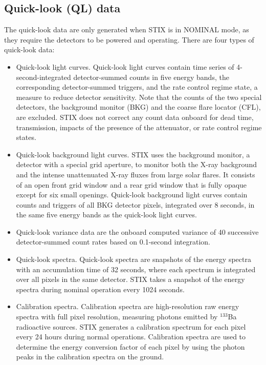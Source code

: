 \documentclass[referee]{aa} %
\begin{document}
\subsection{Quick-look (QL) data}
The quick-look data are only generated when STIX is in NOMINAL mode, as they require the detectors to be powered and operating. There are four types of quick-look data:
\begin{itemize}
\item Quick-look light curves. Quick-look light curves contain time series of 4-second-integrated detector-summed counts in five energy bands, the corresponding detector-summed triggers, and the rate control regime state, a measure to reduce detector sensitivity. Note that the counts of the two special detectors, the background monitor (BKG) and the coarse flare locator (CFL), are excluded. STIX does not correct any count data onboard for dead time, transmission, impacts of the presence of the attenuator, or rate control regime states.

\item Quick-look background light curves. STIX uses the background monitor, a detector with a special grid aperture, to monitor both the X-ray background and the intense unattenuated X-ray fluxes from large solar flares. It consists of an open front grid window and a rear grid window that is fully opaque except for six small openings. Quick-look background light curves contain counts and triggers of all BKG detector pixels, integrated over 8 seconds, in the same five energy bands as the quick-look light curves. 

\item Quick-look variance data are the onboard computed variance of 40 successive detector-summed count rates based on 0.1-second integration.

\item Quick-look spectra. Quick-look spectra are snapshots of the energy spectra with an accumulation time of 32 seconds, where each spectrum is integrated over all pixels in the same detector. STIX takes a snapshot of the energy spectra during nominal operation every 1024 seconds.

\item Calibration spectra. Calibration spectra are high-resolution raw energy spectra with full pixel resolution, measuring photons emitted by $^{133}$Ba radioactive sources. STIX generates a calibration spectrum for each pixel every 24 hours during normal operations. Calibration spectra are used to determine the energy conversion factor of each pixel by using the photon peaks in the calibration spectra on the ground.  
\end{itemize}
\end{document}
